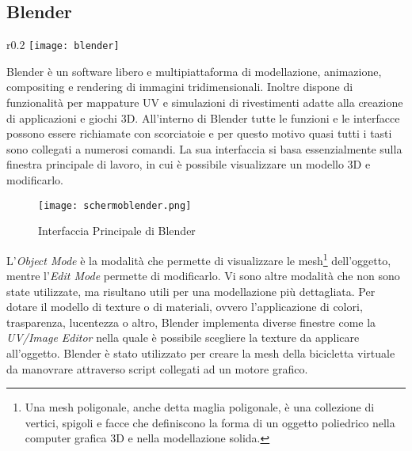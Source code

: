 \subsection{Blender}
\begin{wrapfigure}{r}{0.2\textwidth} %
    \centering
    \vspace{-1.0cm}
    \texttt{[image: blender]}
\end{wrapfigure}
Blender è un software libero e multipiattaforma di modellazione, animazione, compositing e rendering di immagini tridimensionali. Inoltre dispone di funzionalità per mappature UV e simulazioni di rivestimenti adatte alla creazione di applicazioni e giochi 3D. All'interno di Blender tutte le funzioni e le interfacce possono essere richiamate con scorciatoie e per questo motivo quasi tutti i tasti sono collegati a numerosi comandi. La sua interfaccia si basa essenzialmente sulla finestra principale di lavoro, in cui è possibile visualizzare un modello 3D e modificarlo. 
\begin{figure}[hbt]
\centering
  \texttt{[image: schermoblender.png]}
  \caption{Interfaccia Principale di Blender}
\end{figure}

\noindent L'\textit{Object Mode} è la modalità che permette di visualizzare le mesh\footnote{Una mesh poligonale, anche detta maglia poligonale, è una collezione di vertici, spigoli e facce che definiscono la forma di un oggetto poliedrico nella computer grafica 3D e nella modellazione solida.} dell'oggetto, mentre l'\textit{Edit Mode} permette di modificarlo. Vi sono altre modalità che non sono state utilizzate, ma risultano utili per una modellazione più dettagliata. Per dotare il modello di texture o di materiali, ovvero l'applicazione di colori, trasparenza, lucentezza o altro, Blender implementa diverse finestre come la \textit{UV/Image Editor} nella quale è possibile scegliere la texture da applicare all'oggetto. Blender è stato utilizzato per creare la mesh della bicicletta virtuale da manovrare attraverso script collegati ad un motore grafico.
